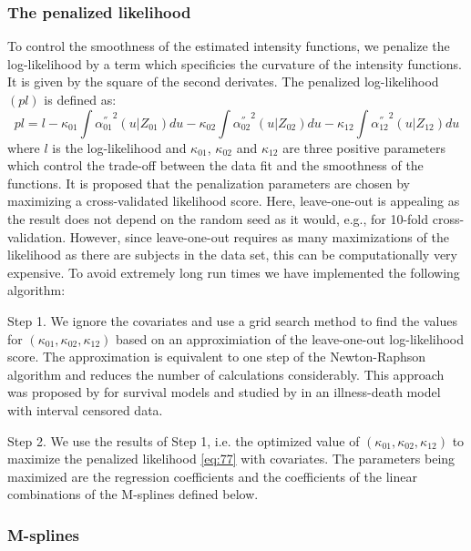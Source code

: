 \documentclass[article]{jss}
\begin{document}
\subsubsection{The penalized likelihood}
\label{sec-3-2-1}

To control the smoothness of the estimated intensity functions, we
penalize the log-likelihood by a term which specificies the curvature
of the intensity functions. It is given by the square of the second
derivates. The penalized log-likelihood \((pl)\) is defined as:
\begin{equation}
\label{eq:77}
pl = l - \kappa_{01} \int {\alpha_{01} ^{''} }^2 (u|Z_{01}) du  - \kappa_{02} \int {\alpha_{02} ^{''} }^2 (u|Z_{02}) du
- \kappa_{12} \int {\alpha_{12} 
^{''} }^2 (u|Z_{12}) du
\end{equation}
where \(l\) is the log-likelihood and \(\kappa_{01}\), \(\kappa_{02}\) and
\(\kappa_{12}\) are three positive parameters which control the
trade-off between the data fit and the smoothness of the functions. It
is proposed that the penalization parameters are chosen by maximizing
a cross-validated likelihood score. Here, leave-one-out is appealing
as the result does not depend on the random seed as it would, e.g.,
for 10-fold cross-validation.  However, since leave-one-out requires
as many maximizations of the likelihood as there are subjects in the
data set, this can be computationally very expensive. To avoid
extremely long run times we have implemented the following algorithm:

Step 1. We ignore the covariates and use a grid search method to find
 the values for \((\kappa_{01}, \kappa_{02}, \kappa_{12})\) based on an
 approximiation of the leave-one-out log-likelihood score.  The
 approximation is equivalent to one step of the Newton-Raphson
 algorithm and reduces the number of calculations considerably. This
 approach was proposed by \citet{O'Sullivan_1988} for survival models
 and studied by \citet{Joly_Commenges_Helmer_Letenneur_2002} in an
 illness-death model
with interval censored data.

Step 2. We use the results of Step 1, i.e. the optimized value of
  \((\kappa_{01}, \kappa_{02}, \kappa_{12})\) to maximize the penalized
  likelihood \eqref{eq:77} with covariates. The parameters being
  maximized are the regression coefficients and the coefficients of
  the linear combinations of the M-splines defined below.

\subsubsection{M-splines}
\label{sec-3-2-2}
\end{document}
